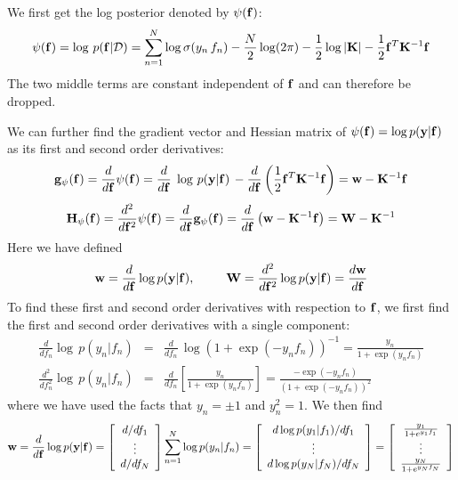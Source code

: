 \documentclass{article}
\begin{document}
We first get the log posterior denoted by $\psi({\bf f})$:
\begin{equation}
  \psi({\bf f})=\log\,p({\bf f}|{\cal D})
  =\sum_{n=1}^N\log\sigma(y_n\,f_n)-\frac{N}{2}\log(2\pi)-\frac{1}{2}\log|{\bf K}|
  -\frac{1}{2}{\bf f}^T {\bf K}^{-1}{\bf f}
  \label{PsiLogPG}
\end{equation}
The two middle terms are constant independent of ${\bf f}$ and can 
therefore be dropped. 

We can further find the gradient vector and Hessian matrix of 
$\psi({\bf f})=\log p({\bf y}|{\bf f})$ as its first and second 
order derivatives:
\begin{equation}
  {\bf g}_{\psi}({\bf f})=\frac{d}{d{\bf f}}\psi({\bf f})
  =\frac{d}{d{\bf f}}\;\log\,p({\bf y}|{\bf f})\,
  -\frac{d}{d{\bf f}}\left(\frac{1}{2} {\bf f}^T{\bf K}^{-1}{\bf f}\right)
  ={\bf w}-{\bf K}^{-1}{\bf f} 
\end{equation}
\begin{equation}
  {\bf H}_{\psi}({\bf f})=\frac{d^2}{d{\bf f}^2}\psi({\bf f}) 
  =\frac{d}{d{\bf f}} {\bf g}_\psi({\bf f})
  =\frac{d}{d{\bf f}} \left( {\bf w}-{\bf K}^{-1}{\bf f}\right)
  ={\bf W}-{\bf K}^{-1}
  \label{HessianPsi2}
\end{equation}
Here we have defined
\begin{equation}
  {\bf w}=\frac{d}{d{\bf f}}\log p({\bf y}|{\bf f}),
  \;\;\;\;\;\;\;\;\;
  {\bf W}=\frac{d^2}{d{\bf f}^2} \log p({\bf y}|{\bf f})
  =\frac{d{\bf w}}{d{\bf f}}
  \label{wW}
\end{equation}
To find these first and second order derivatives with respection to 
${\bf f}$, we first find the first and second order derivatives with
a single component:
\begin{eqnarray}
  \frac{d}{df_n}\log\,p(y_n|f_n)&=&\frac{d}{df_n}\,
  \log\left(1+\exp(-y_n f_n)\right)^{-1}
  =\frac{y_n}{1+\exp(y_n f_n)}
  \nonumber\\
  \frac{d^2}{df_n^2}\log\,p(y_n|f_n)&=&
  \frac{d}{df_n}\left[\frac{y_n}{1+\exp(y_n f_n)}\right]
  =\frac{-\exp(-y_n f_n)}{(1+\exp(-y_n f_n))^2}
\end{eqnarray}
where we have used the facts that $y_n=\pm 1$ and $y_n^2=1$. We then 
find
\begin{equation}
  {\bf w}=\frac{d}{d{\bf f}} \log p({\bf y}|{\bf f})
  =\left[\begin{array}{c}d/df_1\\\vdots\\d/df_N\end{array}\right]
  \sum_{n=1}^N\log p(y_n|f_n)
  =\left[\begin{array}{c}
      d\log p(y_1|f_1)/df_1\\\vdots\\d\log p(y_N|f_N)/df_N
    \end{array}\right]
  =\left[\begin{array}{c}
      \frac{y_1}{1+e^{y_1f_1}}\\ \vdots\\ \frac{y_N}{1+e^{y_Nf_N}}
    \end{array}\right]
  \label{Smallw}
\end{equation}
\end{document}
